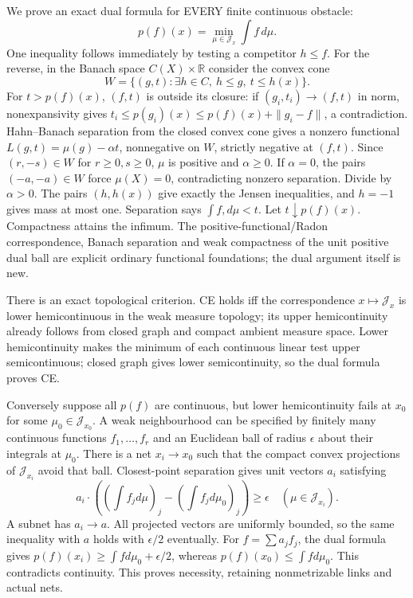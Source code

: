 \documentclass[11pt]{article}
\begin{document}
We prove an exact dual formula for EVERY finite continuous obstacle:
\[
p(f)(x)=\min_{\mu\in\mathcal J_x}\int f\,d\mu.
\]
One inequality follows immediately by testing a competitor \(h\le f\). For the reverse, in the Banach space \(C(X)\times\mathbb R\) consider the convex cone
\[
W=\{(g,t):\exists h\in C,\ h\le g,\ t\le h(x)\}.
\]
For \(t>p(f)(x)\), \((f,t)\) is outside its closure: if \((g_i,t_i)\to(f,t)\) in norm, nonexpansivity gives \(t_i\le p(g_i)(x)\le p(f)(x)+\|g_i-f\|\), a contradiction. Hahn--Banach separation from the closed convex cone gives a nonzero functional \(L(g,t)=\mu(g)-\alpha t\), nonnegative on \(W\), strictly negative at \((f,t)\). Since \((r,-s)\in W\) for \(r\ge0,s\ge0\), \(\mu\) is positive and \(\alpha\ge0\). If \(\alpha=0\), the pairs \((-a,-a)\in W\) force \(\mu(X)=0\), contradicting nonzero separation. Divide by \(\alpha>0\). The pairs \((h,h(x))\) give exactly the Jensen inequalities, and \(h=-1\) gives mass at most one. Separation says \(\int f,d\mu<t\). Let \(t\downarrow p(f)(x)\). Compactness attains the infimum. The positive-functional/Radon correspondence, Banach separation and weak compactness of the unit positive dual ball are explicit ordinary functional foundations; the dual argument itself is new.

There is an exact topological criterion. CE holds iff the correspondence \(x\mapsto\mathcal J_x\) is lower hemicontinuous in the weak measure topology; its upper hemicontinuity already follows from closed graph and compact ambient measure space. Lower hemicontinuity makes the minimum of each continuous linear test upper semicontinuous; closed graph gives lower semicontinuity, so the dual formula proves CE.

Conversely suppose all \(p(f)\) are continuous, but lower hemicontinuity fails at \(x_0\) for some \(\mu_0\in\mathcal J_{x_0}\). A weak neighbourhood can be specified by finitely many continuous functions \(f_1,\ldots,f_r\) and an Euclidean ball of radius \(\epsilon\) about their integrals at \(\mu_0\). There is a net \(x_i\to x_0\) such that the compact convex projections of \(\mathcal J_{x_i}\) avoid that ball. Closest-point separation gives unit vectors \(a_i\) satisfying
\[
a_i\cdot\left(\left(\int f_jd\mu\right)_j-
\left(\int f_jd\mu_0\right)_j\right)\ge\epsilon
\quad(\mu\in\mathcal J_{x_i}).
\]
A subnet has \(a_i\to a\). All projected vectors are uniformly bounded, so the same inequality with \(a\) holds with \(\epsilon/2\) eventually. For \(f=\sum a_j f_j\), the dual formula gives \(p(f)(x_i)\ge\int f d\mu_0+\epsilon/2\), whereas \(p(f)(x_0)\le\int f d\mu_0\). This contradicts continuity. This proves necessity, retaining nonmetrizable links and actual nets.
\end{document}
